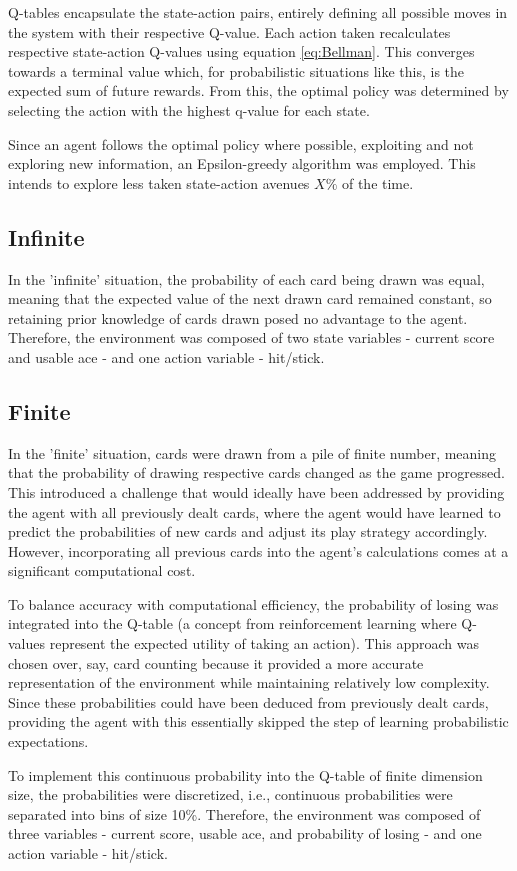 \medskip
Q-tables encapsulate the state-action pairs, entirely defining all possible moves in the system with their respective Q-value. Each action taken recalculates respective state-action Q-values using equation \ref{eq:Bellman}. This converges towards a terminal value which, for probabilistic situations like this, is the expected sum of future rewards. From this, the optimal policy was determined by selecting the action with the highest q-value for each state. 


Since an agent follows the optimal policy where possible, exploiting  and not exploring new information, an Epsilon-greedy algorithm was employed. This intends to explore less taken state-action avenues \(X\%\) of the time. 

\subsection{Infinite}

In the 'infinite' situation, the probability of each card being drawn was equal, meaning that the expected value of the next drawn card remained constant, so retaining prior knowledge of cards drawn posed no advantage to the agent. Therefore, the environment was composed of two state variables - current score and usable ace - and one action variable - hit/stick.

\subsection{Finite}

In the 'finite' situation, cards were drawn from a pile of finite number, meaning that the probability of drawing respective cards changed as the game progressed. This introduced a challenge that would ideally have been addressed by providing the agent with all previously dealt cards, where the agent would have learned to predict the probabilities of new cards and adjust its play strategy accordingly. However, incorporating all previous cards into the agent's calculations comes at a significant computational cost. 

\medskip
To balance accuracy with computational efficiency, the probability of losing was integrated into the Q-table (a concept from reinforcement learning where Q-values represent the expected utility of taking an action). This approach was chosen over, say, card counting because it provided a more accurate representation of the environment while maintaining relatively low complexity. Since these probabilities could have been deduced from previously dealt cards, providing the agent with this essentially skipped the step of learning probabilistic expectations. 

\medskip
To implement this continuous probability into the Q-table of finite dimension size, the probabilities were discretized, i.e., continuous probabilities were separated into bins of size 10\%. Therefore, the environment was composed of three variables - current score, usable ace, and probability of losing - and one action variable - hit/stick. 